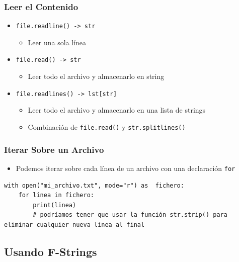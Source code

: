\documentclass[11pt]{beamer}
\begin{document}
\begin{frame}[fragile]\frametitle{Leer el Contenido}
\begin{itemize}
\item \lstinline|file.readline() -> str|
    \begin{itemize}
    \item Leer una sola línea
    \end{itemize}
\item \lstinline|file.read() -> str|
    \begin{itemize}
        \item Leer todo el archivo y almacenarlo en string
    \end{itemize}
\item \lstinline|file.readlines() -> lst[str]|
    \begin{itemize}
        \item Leer todo el archivo y almacenarlo en una lista de strings
        \item Combinación de \lstinline|file.read()| y \lstinline|str.splitlines()|
    \end{itemize}
\end{itemize}
\end{frame}


\begin{frame}[fragile]\frametitle{Iterar Sobre un Archivo}
\begin{itemize}
\item Podemos iterar sobre cada línea de un archivo con una declaración \lstinline|for|
\end{itemize}
\begin{lstlisting}[basicstyle=\small]
with open("mi_archivo.txt", mode="r") as  fichero:
    for linea in fichero:
        print(linea)
        # podríamos tener que usar la función str.strip() para eliminar cualquier nueva línea al final
\end{lstlisting}
\end{frame}



\subsection{Usando F-Strings}
\end{document}
